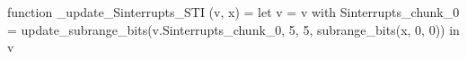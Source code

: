 function _update_Sinterrupts_STI (v, x) = let v = { v with Sinterrupts_chunk_0 = update_subrange_bits(v.Sinterrupts_chunk_0, 5, 5, subrange_bits(x, 0, 0)) } in
  v
